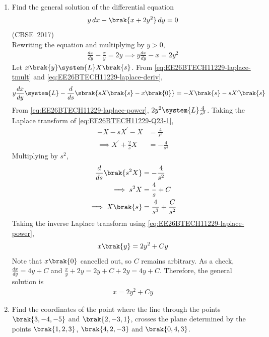 \begin{enumerate}[label=\thesubsection.\arabic*, ref=\thesubsection.\theenumi]
The following code verifies the solution
\begin{lstlisting}[frame=single, basicstyle=\rmfamily, escapeinside={(*@}{@*)}]
(*@\makebox[\dimexpr\linewidth-2\fboxsep-2\fboxrule\relax][c]{codes/coplanar.py}@*)
\end{lstlisting}
\item 
Find the general solution of the differential equation
\begin{align*}
	y\, dx - \brak{x + 2y^2}\, dy = 0
\end{align*}
\hfill (CBSE~2017)
\\
\solution
Rewriting the equation and multiplying by $y > 0$,
\begin{align}
	\frac{dx}{dy} - \frac{x}{y} = 2y
	\implies y\frac{dx}{dy} - x = 2y^2
	\label{eq:EE26BTECH11229-Q23-1}
\end{align}
Let $x\brak{y} \system{L} X\brak{s}$. From \eqref{eq:EE26BTECH11229-laplace-tmult} and \eqref{eq:EE26BTECH11229-laplace-deriv},
\begin{align}
	y\frac{dx}{dy} \system{L} -\frac{d}{ds}\sbrak{sX\brak{s} - x\brak{0}} = -X\brak{s} - sX^{\prime}\brak{s}
\end{align}
From \eqref{eq:EE26BTECH11229-laplace-power}, $2y^2 \system{L} \frac{4}{s^3}$. Taking the Laplace transform of \eqref{eq:EE26BTECH11229-Q23-1},
\begin{align}
	-X - sX^{\prime} - X &= \frac{4}{s^3}
	\\
	\implies X^{\prime} + \frac{2}{s}X &= -\frac{4}{s^4}
\end{align}
Multiplying by $s^2$,
\begin{align}
	\frac{d}{ds}\brak{s^2X} &= -\frac{4}{s^2}
	\\
	\implies s^2X &= \frac{4}{s} + C
	\\
	\implies X\brak{s} &= \frac{4}{s^3} + \frac{C}{s^2}
\end{align}
Taking the inverse Laplace transform using \eqref{eq:EE26BTECH11229-laplace-power},
\begin{align}
	x\brak{y} = 2y^2 + Cy
\end{align}
Note that $x\brak{0}$ cancelled out, so $C$ remains arbitrary. As a check, $\frac{dx}{dy} = 4y + C$ and $\frac{x}{y} + 2y = 2y + C + 2y = 4y + C$. Therefore, the general solution is
\begin{align}
	x = 2y^2 + Cy
\end{align}
\item 
Find the coordinates of the point where the line through the points $\brak{3, -4, -5}$ and $\brak{2, -3, 1}$, crosses the plane determined by the points $\brak{1, 2, 3}$, $\brak{4, 2, -3}$ and $\brak{0, 4, 3}$.

\end{enumerate}
